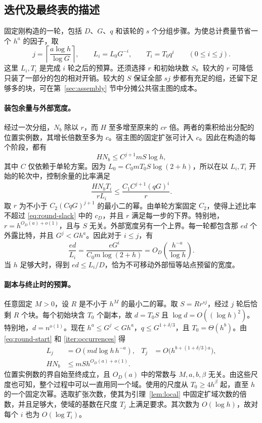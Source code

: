 \subsection{迭代及最终表的描述}\label{iter:subsection}

固定刚构造的一轮，包括 $D$、$G$、$q$ 和该轮的 $s$ 个分组步骤。为使总计费量节省一个 $h^a$ 的因子，取 \[
 j=\left\lceil\frac{a\log h}{\log G}\right\rceil,\qquad
 L_i=L_0G^{-i},\qquad T_i=T_0q^i \qquad(0\le i\le j).
\] 这里 $L_i,T_i$ 是完成 $i$ 轮之后的预算。还须选择 $r$ 和初始块数 $S$。较大的 $r$ 可降低只装了一部分的包的相对开销。较大的 $S$ 保证全部 $sj$ 步都有充足的组，还留下足够多的块，可在第~\ref{sec:assembly} 节中分摊公共宿主图的成本。

\paragraph{装包余量与外部宽度。} 经过一次分组，$N_b$ 除以 $r$，而 $H$ 至多增至原来的 $cr$ 倍。两者的乘积给出分配的位置实例数，其增长倍数至多为 $c$。宿主图的固定扩张可计入 $c$。因此在构造的每个阶段，都有 \begin{equation}
 H N_b\le C^{j+1}mS\log h , \label{iter:occurrences}
\end{equation} 其中 $C$ 仅依赖于单轮方案。因为 $L_0=C_0 mT_0 S\log(2+h)$，所以在以 $L_i,T_i$ 开始的轮次中，控制余量的比率满足 \[
   \frac{H N_b T_i}{rL_i}\le \frac{C_1C^{j+1}(qG)^i}{r}.
\] 取 $r$ 为不小于 $C_2(CqG)^{j+1}$ 的最小二的幂。由单轮方案固定 $C_2$，使得上述比率不超过 \eqref{eq:round-slack} 中的 $c_D$，并且 $r$ 满足每一步的下界。特别地，$r=h^{O_D(a)+o(1)}$，且与 $S$ 无关。外部宽度另有一个上界。每一轮都包含那 $ed$ 个外露比特，并且 $G^j<Gh^a$。因此对于 $i\le j$，有 \[
       \frac{ed}{L_i}=\frac{eG^i}{C_0m\log(2+h)}
           =O_D\!\left(\frac{h^{-a}}{\log h}\right).
\] 当 $h$ 足够大时，得到 $ed\le L_i/D$，恰为不可移动外部恒等站点预留的宽度。

\paragraph{副本与终止时的预算。} 任意固定 $M>0$，设 $R$ 是不小于 $h^M$ 的最小二的幂。取 $S=Rr^{sj}$，经过 $j$ 轮后恰剩 $R$ 个块。每个初始块含 $T_0$ 个副本，故 $d=T_0S$ 且 $\log d=O((\log h)^2)$。特别地，$d=n^{o(1)}$。现在 $h^a\le G^j<Gh^a$，$q\le G^{1+\delta/3}$，且 $T_0=\Theta(h^b)$。由 \eqref{eq:round-start} 和 \eqref{iter:occurrences} 得 \begin{equation}
 \begin{aligned}
 L_j&=O(md\log h\,h^{-a}),&
 T_j&=O\bigl(h^{b+(1+\delta/3)a}\bigr),\\
 HN_b&\le mS h^{O_D(a)+o(1)} .
 \end{aligned}
 \label{eq:round-terminal}
\end{equation} 位置实例数的界自始至终成立，且 $O_D(a)$ 中的常数与 $M,a,b,\beta$ 无关。由这些尺度也可知，整个过程中可以一直用同一个域。使用的尺度从 $T_0\ge4h^\beta$ 起，直至 $h$ 的一个固定次幂。选取扩张次数，使其为引理~\ref{lem:local} 中固定扩域次数的倍数，并且足够大，使域的基数在尺度 $T_j$ 上满足要求。其次数为 $O(\log h)$，故对每个 $i$ 也为 $O(\log T_i)$。

